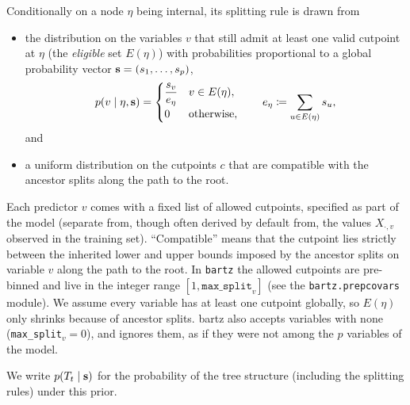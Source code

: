 Conditionally on a node $\eta$ being internal, its splitting rule is drawn
from
\begin{itemize}
	\item the distribution on the variables $v$ that still admit at least
	      one valid cutpoint at $\eta$ (the \emph{eligible} set $E(\eta)$)
	      with probabilities proportional to a global probability vector
	      $\mathbf{s} = (s_1, \dots, s_p)$,
	      \begin{equation}
		      \label{eq:mv-var-prior}
		      p(v \mid \eta, \mathbf{s}) =
		      \begin{cases}
			      \dfrac{s_v}{e_\eta} & v \in E(\eta), \\[1ex]
			      0                   & \text{otherwise},
		      \end{cases}
		      \qquad
		      e_\eta \coloneqq \sum_{u \in E(\eta)} s_u,
	      \end{equation}
	      and
	\item a uniform distribution on the cutpoints $c$ that are compatible with
	      the ancestor splits along the path to the root.
\end{itemize}
Each predictor $v$ comes with a fixed list of allowed cutpoints, specified as
part of the model (separate from, though often derived by default from, the
values $X_{\cdot,v}$ observed in the training set). ``Compatible'' means
that the cutpoint lies strictly between the inherited lower and upper bounds
imposed by the ancestor splits on variable $v$ along the path to the root.
In \texttt{bartz} the allowed cutpoints are pre-binned and live in the
integer range $[1, \texttt{max\_split}_v]$ (see the
\texttt{bartz.prepcovars} module). We assume every variable has at least one
cutpoint globally, so $E(\eta)$ only shrinks because of ancestor splits.
bartz also accepts variables with none (\texttt{max\_split}$_v = 0$), and
ignores them, as if they were not among the $p$ variables of the model.

We write $p(T_t \mid \mathbf{s})$ for the probability of the tree structure
(including the splitting rules) under this prior.

